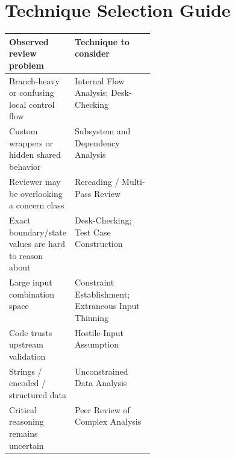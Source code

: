 \documentclass[10pt]{article}
\begin{document}
\section{Technique Selection Guide}
\par\smallskip\noindent\begin{tabularx}{\linewidth}{@{}L{0.28\linewidth}Y@{}}
\toprule
Observed review problem & Technique to consider \\
\midrule
Branch-heavy or confusing local control flow & Internal Flow Analysis; Desk-Checking \\
Custom wrappers or hidden shared behavior & Subsystem and Dependency Analysis \\
Reviewer may be overlooking a concern class & Rereading / Multi-Pass Review \\
Exact boundary/state values are hard to reason about & Desk-Checking; Test Case Construction \\
Large input combination space & Constraint Establishment; Extraneous Input Thinning \\
Code trusts upstream validation & Hostile-Input Assumption \\
Strings / encoded / structured data & Unconstrained Data Analysis \\
Critical reasoning remains uncertain & Peer Review of Complex Analysis \\
\bottomrule
\end{tabularx}

\end{document}
